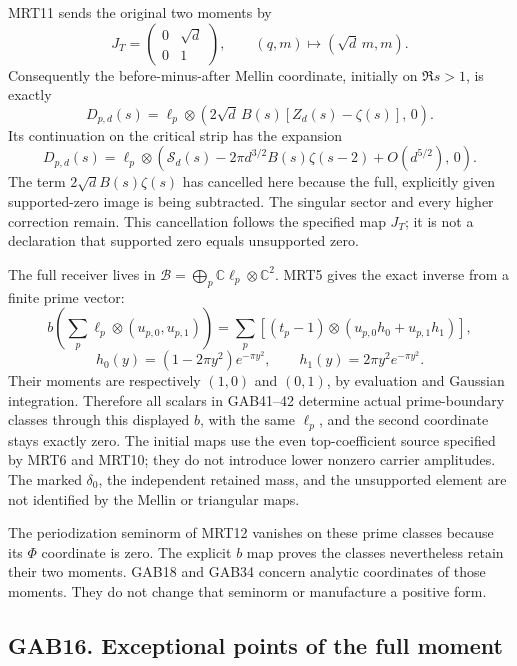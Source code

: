 \documentclass[
  10pt,
  a4paper,
]{article}
\begin{document}
MRT11 sends the original two moments by \[
 J_T=\begin{pmatrix}0&\sqrt d\\0&1\end{pmatrix},
 \qquad(q,m)\longmapsto(\sqrt d\,m,m).
\] Consequently the before-minus-after Mellin coordinate, initially on
\(\Re s>1\), is exactly \[
 D_{p,d}(s)=
   \ell_p\otimes
   \left(2\sqrt d\,B(s)[Z_d(s)-\zeta(s)],\,0\right).
                                                        \tag{GAB41}
\] Its continuation on the critical strip has the expansion \[
 D_{p,d}(s)=\ell_p\otimes
   \left(\mathcal S_d(s)
     -2\pi d^{3/2}B(s)\zeta(s-2)
     +O(d^{5/2}),\,0\right).                           \tag{GAB42}
\] The term \(2\sqrt d B(s)\zeta(s)\) has cancelled here because the
full, explicitly given supported-zero image is being subtracted. The
singular sector and every higher correction remain. This cancellation
follows the specified map \(J_T\); it is not a declaration that
supported zero equals unsupported zero.

The full receiver lives in
\(\mathcal B=\bigoplus_p\mathbb C\ell_p\otimes\mathbb C^2\). MRT5 gives
the exact inverse from a finite prime vector: \[
 b\!\left(\sum_p\ell_p\otimes(u_{p,0},u_{p,1})\right)
 =\sum_p[(t_p-1)\otimes(u_{p,0}h_0+u_{p,1}h_1)],
\] \[
 h_0(y)=(1-2\pi y^2)e^{-\pi y^2},\qquad
 h_1(y)=2\pi y^2e^{-\pi y^2}.
\] Their moments are respectively \((1,0)\) and \((0,1)\), by evaluation
and Gaussian integration. Therefore all scalars in GAB41--42 determine
actual prime-boundary classes through this displayed \(b\), with the
same \(\ell_p\), and the second coordinate stays exactly zero. The
initial maps use the even top-coefficient source specified by MRT6 and
MRT10; they do not introduce lower nonzero carrier amplitudes. The
marked \(\delta_0\), the independent retained mass, and the unsupported
element are not identified by the Mellin or triangular maps.

The periodization seminorm of MRT12 vanishes on these prime classes
because its \(\Phi\) coordinate is zero. The explicit \(b\) map proves
the classes nevertheless retain their two moments. GAB18 and GAB34
concern analytic coordinates of those moments. They do not change that
seminorm or manufacture a positive form.

\subsection{GAB16. Exceptional points of the full
moment}\label{gab16.-exceptional-points-of-the-full-moment}
\end{document}
